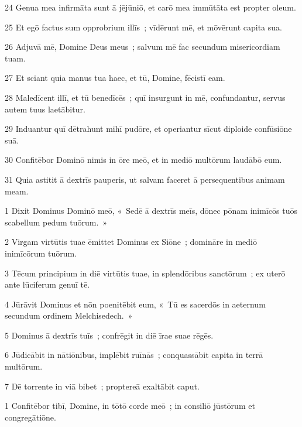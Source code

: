 \psalmVerse
  {\phantom{0}24}
  {Genua mea infirmāta sunt ā jējūniō, et carō mea immūtāta est propter oleum.}


\psalmVerse
  {\phantom{0}25}
  {Et egō factus sum opprobrium illīs~; vīdērunt mē, et mōvērunt capita sua.}


\psalmVerse
  {\phantom{0}26}
  {Adjuvā mē, Domine Deus meus~; salvum mē fac secundum misericordiam tuam.}


\psalmVerse
  {\phantom{0}27}
  {Et sciant quia manus tua haec, et tū, Domine, fēcistī eam.}


\psalmVerse
  {\phantom{0}28}
  {Maledīcent illī, et tū benedīcēs~; quī insurgunt in mē, confundantur, servus autem tuus laetābitur.}


\psalmVerse
  {\phantom{0}29}
  {Induantur quī dētrahunt mihī pudōre, et operiantur sīcut diploide confūsiōne suā.}


\psalmVerse
  {\phantom{0}30}
  {Confitēbor Dominō nimis in ōre meō, et in mediō multōrum laudābō eum.}


\psalmVerse
  {\phantom{0}31}
  {Quia astitit ā dextrīs pauperis, ut salvam faceret ā persequentibus animam meam.}




\psalmVerse
  {\phantom{00}1}
  {Dixit Dominus Dominō meō, «~Sedē ā dextrīs meīs, dōnec pōnam inimīcōs tuōs scabellum pedum tuōrum.~»}


\psalmVerse
  {\phantom{00}2}
  {Virgam virtūtis tuae ēmittet Dominus ex Siōne~; domināre in mediō inimīcōrum tuōrum.}


\psalmVerse
  {\phantom{00}3}
  {Tēcum principium in diē virtūtis tuae, in splendōribus sanctōrum~; ex uterō ante lūciferum genuī tē.}


\psalmVerse
  {\phantom{00}4}
  {Jūrāvit Dominus et nōn poenitēbit eum, «~Tū es sacerdōs in aeternum secundum ordinem Melchisedech.~»}


\psalmVerse
  {\phantom{00}5}
  {Dominus ā dextrīs tuīs~; confrēgit in diē īrae suae rēgēs.}


\psalmVerse
  {\phantom{00}6}
  {Jūdicābit in nātiōnibus, implēbit ruīnās~; conquassābit capita in terrā multōrum.}


\psalmVerse
  {\phantom{00}7}
  {Dē torrente in viā bibet~; proptereā exaltābit caput.}



\psalmVerse
  {\phantom{00}1}
  {Confitēbor tibī, Domine, in tōtō corde meō~; in consiliō jūstōrum et congregātiōne.}


